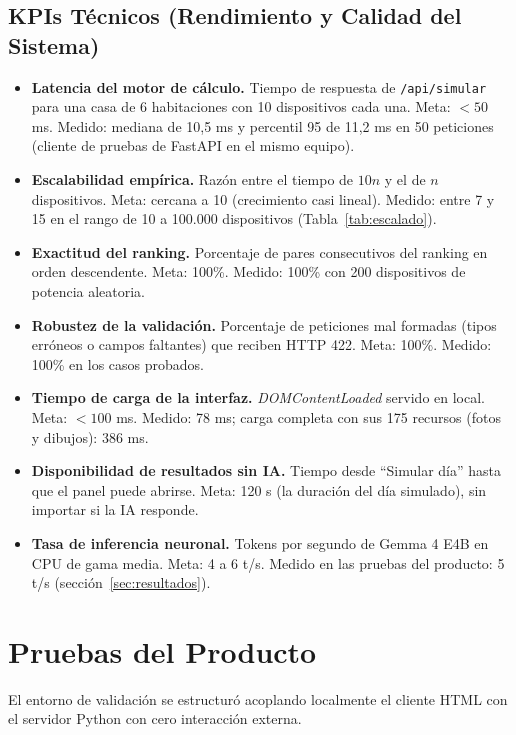 \documentclass[10pt,journal,compsoc]{IEEEtran}
\begin{document}
\subsection{KPIs Técnicos (Rendimiento y Calidad del Sistema)}
\begin{itemize}
\item \textbf{Latencia del motor de cálculo.} Tiempo de respuesta de \texttt{/api/simular} para una casa de 6 habitaciones con 10 dispositivos cada una. Meta: $< 50$ ms. Medido: mediana de 10,5 ms y percentil 95 de 11,2 ms en 50 peticiones (cliente de pruebas de FastAPI en el mismo equipo).
\item \textbf{Escalabilidad empírica.} Razón entre el tiempo de $10n$ y el de $n$ dispositivos. Meta: cercana a 10 (crecimiento casi lineal). Medido: entre 7 y 15 en el rango de 10 a 100.000 dispositivos (Tabla~\ref{tab:escalado}).
\item \textbf{Exactitud del ranking.} Porcentaje de pares consecutivos del ranking en orden descendente. Meta: 100\%. Medido: 100\% con 200 dispositivos de potencia aleatoria.
\item \textbf{Robustez de la validación.} Porcentaje de peticiones mal formadas (tipos erróneos o campos faltantes) que reciben HTTP 422. Meta: 100\%. Medido: 100\% en los casos probados.
\item \textbf{Tiempo de carga de la interfaz.} \emph{DOMContentLoaded} servido en local. Meta: $< 100$ ms. Medido: 78 ms; carga completa con sus 175 recursos (fotos y dibujos): 386 ms.
\item \textbf{Disponibilidad de resultados sin IA.} Tiempo desde ``Simular día'' hasta que el panel puede abrirse. Meta: 120 s (la duración del día simulado), sin importar si la IA responde.
\item \textbf{Tasa de inferencia neuronal.} Tokens por segundo de Gemma 4 E4B en CPU de gama media. Meta: 4 a 6 t/s. Medido en las pruebas del producto: 5 t/s (sección~\ref{sec:resultados}).
\end{itemize}

\section{Pruebas del Producto}
El entorno de validación se estructuró acoplando localmente el cliente HTML con el servidor Python con cero interacción externa.
\end{document}
